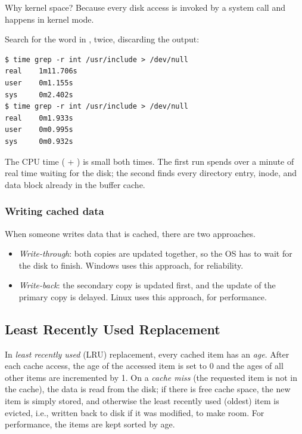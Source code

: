 Why kernel space? Because every disk access is invoked by a system call and happens in kernel mode.

\begin{example}
  Search for the word  in , twice, discarding the output:
\begin{lstlisting}[style=sh]
$ time grep -r int /usr/include > /dev/null
real    1m11.706s
user    0m1.155s
sys     0m2.402s
$ time grep -r int /usr/include > /dev/null
real    0m1.933s
user    0m0.995s
sys     0m0.932s
\end{lstlisting}
  The CPU time ( + ) is small both times. The first run spends over a minute of real time waiting for the disk; the second finds every directory entry, inode, and data block already in the buffer cache.
\end{example}

\subsubsection{Writing cached data}
When someone writes data that is cached, there are two approaches.
\begin{itemize}
  \item \emph{Write-through}: both copies are updated together, so the OS has to wait for the disk to finish. Windows uses this approach, for reliability.
  \item \emph{Write-back}: the secondary copy is updated first, and the update of the primary copy is delayed. Linux uses this approach, for performance.
\end{itemize}

\subsection{Least Recently Used Replacement}

\begin{definition}[LRU]
  In \emph{least recently used} (LRU) replacement, every cached item has an \emph{age}. After each cache access, the age of the accessed item is set to 0 and the ages of all other items are incremented by 1. On a \emph{cache miss} (the requested item is not in the cache), the data is read from the disk; if there is free cache space, the new item is simply stored, and otherwise the least recently used (oldest) item is evicted, i.e., written back to disk if it was modified, to make room. For performance, the items are kept sorted by age.
\end{definition}

